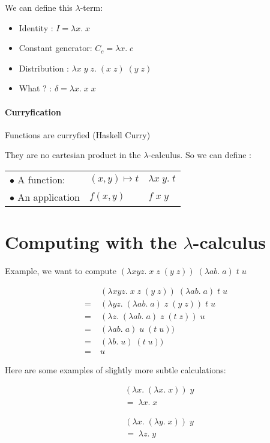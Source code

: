 \documentclass{article}
\theoremstyle{plain}
\theoremstyle{plain}
\begin{document}
  \exam We can define this $\lambda$-term:

  \begin{itemize}
    \item Identity : $I = \lambda x.\; x$
    \item Constant generator: $C_c = \lambda x.\; c$
    \item Distribution : $\lambda x\; y\; z.\; (x\;z)\; (y\;z)$
    \item What ? : $\delta = \lambda x.\;x\;x$
  \end{itemize}


  \paragraph{Curryfication} Functions are curryfied (Haskell Curry)

  They are no cartesian product in the $\lambda$-calculus. So we can define :

  \begin{center}
  \begin{tabular}{l l l}
    $\bullet$ A function: & $(x, y)\mapsto t$ & $\lambda x\;y.\; t$ \\
    $\bullet$ An application & $f(x, y)$ & $f\; x\; y$
  \end{tabular}
  \end{center}

  \section{Computing with the $\lambda$-calculus}

  Example, we want to compute $(\lambda x y z.\; x\; z\; (y\; z))\; (\lambda a
  b.\; a)\; t\; u$

  \begin{align*}
    &\;(\lambda x y z.\; x\; z\; (y\; z))\; (\lambda a b.\; a)\; t\; u \\
    =&\;(\lambda y z.\; (\lambda a b.\; a)\; z\; (y\; z))\; t\; u \\
    =&\;(\lambda z.\; (\lambda a b.\; a)\; z\; (t\; z))\; u \\
    =&\;(\lambda a b.\; a)\; u\; (t\; u))\\
    =&\;(\lambda b.\; u)\; (t\; u))\\
    =&\;u
  \end{align*}

  Here are some examples of slightly more subtle calculations:
  \begin{multicols}{2}
    \begin{align*}
      &(\lambda x.\; (\lambda x.\; x))\; y \\
      &=\; \lambda x.\; x
    \end{align*}

    \begin{align*}
      &(\lambda x.\; (\lambda y.\; x))\; y \\
      &=\; \lambda z.\; y
    \end{align*}
  \end{multicols}
\end{document}
